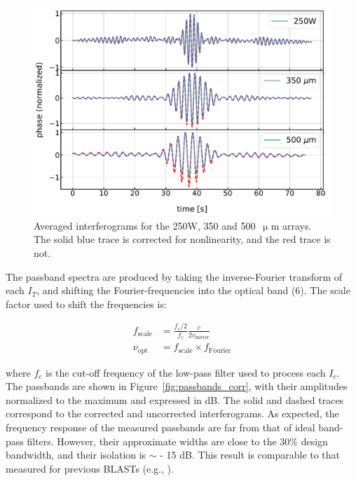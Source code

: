 \begin{figure}[!htbp]
\centering
\includegraphics[width=\textwidth]{figures/blast_data/fts/fts_avg_interfs_raw}
\caption{Averaged interferograms for the 250W, 350 and 500~$\upmu$m arrays. The solid blue trace is corrected for nonlinearity, and the red trace is not.}
\label{fig:avg interfs}
\end{figure}

The passband spectra are produced by taking the inverse-Fourier transform of each $I_{T}$, and shifting the Fourier-frequencies into the optical band (6). The scale factor used to shift the frequencies is:

\begin{equation}\label{eq:fts scale}
  \begin{aligned}
  f_{\mathrm{scale}} &= \frac{f_{s}/2}{f_{c}}\frac{c}{2v_{\mathrm{mirror}}} \\
  \nu_{\mathrm{opt}} &= f_{\mathrm{scale}} \times f_{\mathrm{Fourier}}
  \end{aligned}
\end{equation}

where $f_{c}$ is the cut-off frequency of the low-pass filter used to process each $I_{c}$. The passbands are shown in Figure~\ref{fig:passbands_corr}, with their amplitudes normalized to the maximum and expressed in dB. The solid and dashed traces correspond to the corrected and uncorrected interferograms. As expected, the frequency response of the measured passbands are far from that of ideal band-pass filters. However, their approximate widths are close to the 30\% design bandwidth, and their isolation is $\sim$ - 15 dB. This result is comparable to that measured for previous BLASTs (e.g., \citet{galitzki}).


